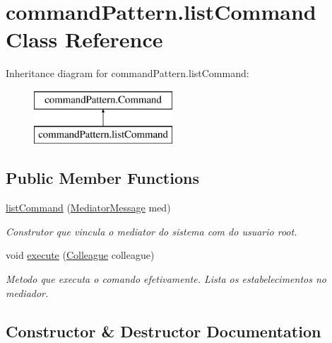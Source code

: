 \hypertarget{classcommand_pattern_1_1list_command}{}\section{command\+Pattern.\+list\+Command Class Reference}
\label{classcommand_pattern_1_1list_command}
Inheritance diagram for command\+Pattern.\+list\+Command\+:\begin{figure}[H]
\begin{center}
\leavevmode
\includegraphics[height=2.000000cm]{classcommand_pattern_1_1list_command}
\end{center}
\end{figure}
\subsection*{Public Member Functions}
\begin{DoxyCompactItemize}
\item 
\mbox{\hyperlink{classcommand_pattern_1_1list_command_aa5a690bc8e22717cb5819ed54df0f95b}{list\+Command}} (\mbox{\hyperlink{classmediator_pattern_1_1_mediator_message}{Mediator\+Message}} med)
\begin{DoxyCompactList}\small\item\em Construtor que vincula o mediator do sistema com do usuario root. \end{DoxyCompactList}\item 
void \mbox{\hyperlink{classcommand_pattern_1_1list_command_a07df0f4664e8ac6fa0ecb37ba49f1611}{execute}} (\mbox{\hyperlink{classmediator_pattern_1_1_colleague}{Colleague}} colleague)
\begin{DoxyCompactList}\small\item\em Metodo que executa o comando efetivamente. Lista os estabelecimentos no mediador. \end{DoxyCompactList}\end{DoxyCompactItemize}


\subsection{Constructor \& Destructor Documentation}
\mbox{\label{classcommand_pattern_1_1list_command_aa5a690bc8e22717cb5819ed54df0f95b}} 
